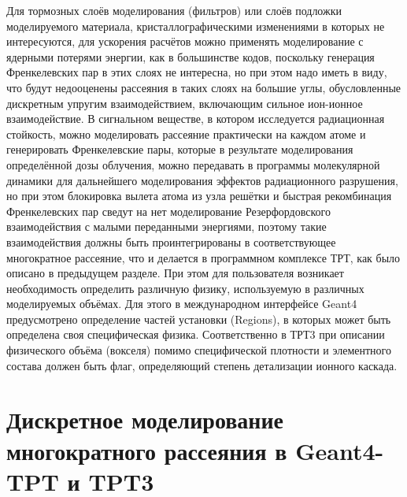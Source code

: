 \documentclass[a4paper,12pt]{article}
\begin{document}
\begin{large}
	Для тормозных слоёв моделирования (фильтров) или слоёв подложки моделируемого материала, кристаллографическими изменениями в которых не интересуются, для ускорения расчётов можно применять моделирование с ядерными потерями энергии, как в большинстве кодов, поскольку генерация Френкелевских пар в этих слоях не интересна, но при этом надо иметь в виду, что будут недооценены рассеяния в таких слоях на большие углы, обусловленные дискретным упругим взаимодействием, включающим сильное ион-ионное взаимодействие.
	В сигнальном веществе, в котором исследуется радиационная стойкость, можно моделировать рассеяние практически на каждом атоме и генерировать Френкелевские пары, которые в результате моделирования определённой дозы облучения, можно передавать в программы молекулярной динамики для дальнейшего моделирования эффектов радиационного разрушения, но при этом блокировка вылета атома из узла решётки и быстрая рекомбинация Френкелевских пар сведут на нет моделирование Резерфордовского взаимодействия с малыми переданными энергиями, поэтому такие взаимодействия должны быть проинтегрированы в соответствующее многократное рассеяние, что и делается в программном комплексе ТРТ, как было описано в предыдущем разделе.
	При этом для пользователя возникает необходимость определить различную физику, используемую в различных моделируемых объёмах.
	Для этого в международном интерфейсе Geant4 предусмотрено определение частей установки (Regions), в которых может быть определена своя специфическая физика.
	Соответственно в ТРТ3 при описании физического объёма (вокселя) помимо специфической плотности и элементного состава должен быть флаг, определяющий степень детализации ионного каскада.

\clearpage
\section{Дискретное моделирование многократного рассеяния в Geant4-TPT  и TPT3}
\label{Mod}


\end{large}
\end{document}
